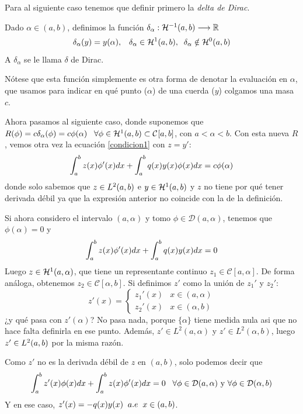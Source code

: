 Para al siguiente caso tenemos que definir primero la \textit{delta de Dirac}.

\medskip

\begin{definition}
Dado $\alpha\in(a,b)$, definimos la función $\funcion{\delta_\alpha}{\sobolev{-1}}{\R}$
\[
\delta_\alpha(y)=y(\alpha), \espacio \delta_\alpha\in\sobolev{1}, \;\; \delta_\alpha\notin\sobolev{0}
\]
A $\delta_\alpha$ se le llama $\delta$ de Dirac.
\end{definition}
\begin{remark}
Nótese que esta función simplemente es otra forma de denotar la evaluación en $\alpha$, que usamos para indicar en qué punto ($\alpha$) de una cuerda ($y$) colgamos una masa $c$. 
\end{remark}

Ahora pasamos al siguiente caso, donde suponemos que $R(\phi)=c\delta_\alpha(\phi)=c\phi(\alpha) \espacio \forall \phi\in\sobolev{1}\subset\continuas$, con $a<\alpha<b$. Con esta nueva $R$, vemos otra vez la ecuación \ref{condicion1} con $z=y'$:
\[
\integral{a}{b}{z(x)\phi'(x)dx}+\integral{a}{b}{q(x)y(x)\phi(x)dx}=c\phi(\alpha)
\]
donde solo sabemos que $z\in\lebesgue{2}$ e $y\in\sobolev{1}$ y $z$ no tiene por qué tener derivada débil ya que la expresión anterior no coincide con la de la definición. 

Si ahora considero el intervalo $(a,\alpha)$ y tomo $\phi\in\mathcal{D}(a,\alpha)$, tenemos que $\phi(\alpha)=0$ y
\[
\integral{a}{b}{z(x)\phi'(x)dx}+\integral{a}{b}{q(x)y(x)dx}=0
\]
Luego $z\in\sobolev[a,\alpha]{1}$, que tiene un representante continuo $z_1\in\mathcal{C}[a,\alpha]$. De forma análoga, obtenemos $z_2\in\mathcal{C}[\alpha,b]$. Si definimos $z'$ como la unión de $z_1'$ y $z_2'$:
\[
z'(x)= \left\{
\begin{array}{cc}
z_1'(x) & x\in(a,\alpha) \\
z_2'(x) & x\in(\alpha,b)
\end{array}
\right.
\]
¿y qué pasa con $z'(\alpha)$? No pasa nada, porque $\{\alpha\}$ tiene medida nula asi que no hace falta definirla en ese punto. Además, $z'\in L^2(a,\alpha)$ y $z'\in L^2(\alpha,b)$, luego $z'\in\lebesgue{2}$ por la misma razón. 

Como $z'$ no es la derivada débil de $z$ en $(a,b)$, solo podemos decir que
\[
\integral{a}{b}{z'(x)\phi(x)dx}+\integral{a}{b}{z(x)\phi'(x)dx}=0 \espacio \forall \phi\in\mathcal{D}(a,\alpha) \text{ y } \forall \phi\in\mathcal{D}(\alpha,b)
\]
Y en ese caso, $z'(x)=-q(x)y(x) \;\; \casipordoquier$. 

